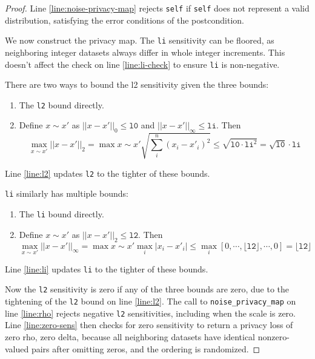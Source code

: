 \documentclass{article}
\begin{document}
\begin{proof}
    Line \ref{line:noise-privacy-map} rejects \texttt{self} if \texttt{self} does not represent a valid distribution,
    satisfying the error conditions of the postcondition.

    We now construct the privacy map.
    The \texttt{li} sensitivity can be floored,
    as neighboring integer datasets always differ in whole integer increments.
    This doesn't affect the check on line \ref{line:li-check} to ensure \texttt{li} is non-negative.

    There are two ways to bound the l2 sensitivity given the three bounds:
    \begin{enumerate}
        \item The \texttt{l2} bound directly.
        \item Define $x \sim x'$ as $||x - x'||_0 \leq \texttt{l0}$ and $||x - x'||_\infty \leq \texttt{li}$. Then
        \begin{equation}
            \max_{x \sim x'} ||x - x'||_2 = \max{x \sim x'} \sqrt{\sum^n_i (x_i - x'_i)^2} \leq \sqrt{\texttt{l0} \cdot \texttt{li}^2} = \sqrt{\texttt{l0}} \cdot \texttt{li}
        \end{equation}
    \end{enumerate}
    Line \ref{line:l2} updates \texttt{l2} to the tighter of these bounds.

    \texttt{li} similarly has multiple bounds:
    \begin{enumerate}
        \item The \texttt{li} bound directly.
        \item Define $x \sim x'$ as $||x - x'||_2 \leq \texttt{l2}$. Then
        \begin{equation}
            \max_{x \sim x'} ||x - x'||_\infty = \max{x \sim x'} \max_i |x_i - x'_i| \leq \max_i [0, \cdots, \lfloor\texttt{l2}\rfloor, \cdots, 0] = \lfloor\texttt{l2}\rfloor
        \end{equation}
    \end{enumerate}
    Line \ref{line:li} updates \texttt{li} to the tighter of these bounds.

    Now the \texttt{l2} sensitivity is zero if any of the three bounds are zero,
    due to the tightening of the \texttt{l2} bound on line \ref{line:l2}.
    The call to \texttt{noise\_privacy\_map} on line \ref{line:rho} rejects negative \texttt{l2} sensitivities,
    including when the scale is zero.
    Line \ref{line:zero-sens} then checks for zero sensitivity to return a privacy loss of zero rho, zero delta,
    because all neighboring datasets have identical nonzero-valued pairs after omitting zeros, and the ordering is randomized.


\end{proof}
\end{document}
